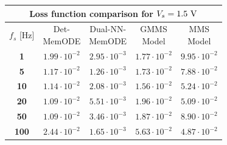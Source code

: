 \documentclass[lettersize,journal]{IEEEtran}
\begin{document}
\begin{table}
\begin{tabular}{c|cccc}
    \bottomrule
  \end{tabular}
  \begin{tabular}{c|cccc}
    \toprule
    \multicolumn{5}{c}{\textbf{Loss function comparison for \(V_s = 1.5 \rm \ V\)}}                                                                                                                  \\
    \midrule
    \(f_s\) [Hz] & \makecell{Det-                                                                                                                                                                    \\MemODE}             & \makecell{Dual-NN-                                                                                                             \\ MemODE}                 & \makecell{GMMS\\Model}             & \makecell{MMS\\Model}                                        \\
    \midrule
    \textbf{1}   & \(1.99 \cdot 10^{-2}\) & \color{ieeegreen} \bfseries \(2.95 \cdot 10^{-3}\) & \(1.77 \cdot 10^{-2}\)                           & \color{ieeered} \bfseries \(9.95 \cdot 10^{-2}\) \\
    \textbf{5}   & \(1.17 \cdot 10^{-2}\) & \color{ieeegreen} \bfseries \(1.26 \cdot 10^{-3}\) & \(1.73 \cdot 10^{-2}\)                           & \color{ieeered} \bfseries \(7.88 \cdot 10^{-2}\) \\
    \textbf{10}  & \(1.14 \cdot 10^{-2}\) & \color{ieeegreen} \bfseries \(2.08 \cdot 10^{-3}\) & \(1.56 \cdot 10^{-2}\)                           & \color{ieeered} \bfseries \(5.24 \cdot 10^{-2}\) \\
    \textbf{20}  & \(1.09 \cdot 10^{-2}\) & \color{ieeegreen} \bfseries \(5.51 \cdot 10^{-3}\) & \(1.96 \cdot 10^{-2}\)                           & \color{ieeered} \bfseries \(5.09 \cdot 10^{-2}\) \\
    \textbf{50}  & \(1.09 \cdot 10^{-2}\) & \color{ieeegreen} \bfseries \(3.46 \cdot 10^{-3}\) & \(1.87 \cdot 10^{-2}\)                           & \color{ieeered} \bfseries \(8.90 \cdot 10^{-2}\) \\
    \textbf{100} & \(2.44 \cdot 10^{-2}\) & \color{ieeegreen} \(1.65 \cdot 10^{-3}\)           & \color{ieeered} \bfseries \(5.63 \cdot 10^{-2}\) & \(4.87 \cdot 10^{-2}\)                           \\
    \bottomrule
  \end{tabular}
\end{table}
\end{document}
